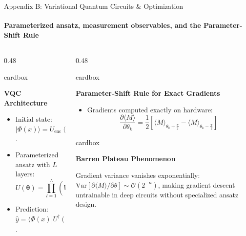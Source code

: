 \documentclass[aspectratio=169, 10pt]{beamer}
\newcommand{\cardbox}[3]{%
  \begin{beamercolorbox}[wd=\linewidth,rounded=true,sep=2.5pt]{cardbox}%
    {\bfseries\scriptsize\color{#1}#2\par}\vspace*{1pt}%
    {\footnotesize #3}%
  \end{beamercolorbox}%
}
\begin{document}
\begin{frame}{Appendix B: Variational Quantum Circuits \& Optimization}
  \framesubtitle{Parameterized ansatz, measurement observables, and the Parameter-Shift Rule}

  \begin{columns}[T]
    \begin{column}{0.48\textwidth}
      \cardbox{DeepPurple}{VQC Architecture}{
        \begin{itemize}\setlength\itemsep{1pt}\scriptsize
          \item Initial state: $|\Phi(x)\rangle = U_{\text{enc}}(x)|0\rangle^{\otimes n}$.
          \item Parameterized ansatz with $L$ layers:
          \[
            U(\mathbf{\theta}) = \prod_{l=1}^L \left( W_{\text{ent}} \cdot \bigotimes_{j=1}^n R_y(\theta_{j,l}) R_z(\theta'_{j,l}) \right)
          \]
          \item Prediction: $\hat{y} = \langle\Phi(x)| U^\dagger(\mathbf{\theta}) Z_0 U(\mathbf{\theta}) |\Phi(x)\rangle$.
        \end{itemize}
      }
    \end{column}

    \begin{column}{0.48\textwidth}
      \cardbox{TealAccent}{Parameter-Shift Rule for Exact Gradients}{
        \begin{itemize}\setlength\itemsep{1pt}\scriptsize
          \item Gradients computed exactly on hardware:
          \[
            \frac{\partial \langle M \rangle}{\partial \theta_k} = \frac{1}{2}\left[\langle M \rangle_{\theta_k + \frac{\pi}{2}} - \langle M \rangle_{\theta_k - \frac{\pi}{2}}\right]
          \]
        \end{itemize}
      }
      \vspace*{3pt}
      \cardbox{CoralRed}{Barren Plateau Phenomenon}{
        \scriptsize Gradient variance vanishes exponentially: $\text{Var}\left[\partial \langle M \rangle / \partial \theta\right] \sim \mathcal{O}(2^{-n})$, making gradient descent untrainable in deep circuits without specialized ansatz design.
      }
    \end{column}
  \end{columns}
\end{frame}
\end{document}
